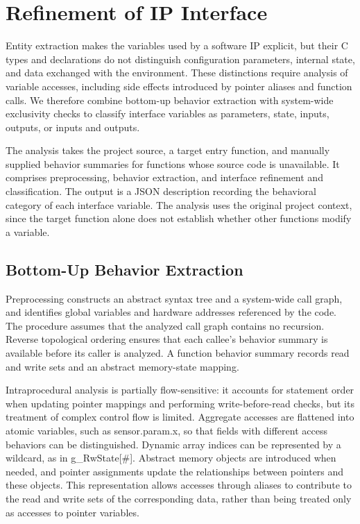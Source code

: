 \documentclass[manuscript, screen, review]{acmart}
\begin{document}
\section{Refinement of IP Interface}
 
Entity extraction makes the variables used by a software IP explicit, but their C types and declarations do not distinguish configuration parameters, internal state, and data exchanged with the environment. These distinctions require analysis of variable accesses, including side effects introduced by pointer aliases and function calls. We therefore combine bottom-up behavior extraction with system-wide exclusivity checks to classify interface variables as parameters, state, inputs, outputs, or inputs and outputs.

The analysis takes the project source, a target entry function, and manually supplied behavior summaries for functions whose source code is unavailable. It comprises preprocessing, behavior extraction, and interface refinement and classification. The output is a JSON description recording the behavioral category of each interface variable. The analysis uses the original project context, since the target function alone does not establish whether other functions modify a variable.

\subsection{Bottom-Up Behavior Extraction}

Preprocessing constructs an abstract syntax tree and a system-wide call graph, and identifies global variables and hardware addresses referenced by the code. The procedure assumes that the analyzed call graph contains no recursion. Reverse topological ordering ensures that each callee's behavior summary is available before its caller is analyzed. A function behavior summary records read and write sets and an abstract memory-state mapping.

Intraprocedural analysis is partially flow-sensitive: it accounts for statement order when updating pointer mappings and performing write-before-read checks, but its treatment of complex control flow is limited. Aggregate accesses are flattened into atomic variables, such as sensor.param.x, so that fields with different access behaviors can be distinguished. Dynamic array indices can be represented by a wildcard, as in g\_RwState[\#]. Abstract memory objects are introduced when needed, and pointer assignments update the relationships between pointers and these objects. This representation allows accesses through aliases to contribute to the read and write sets of the corresponding data, rather than being treated only as accesses to pointer variables.
\end{document}
